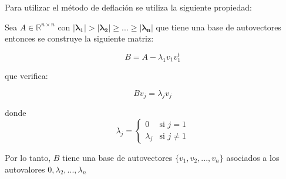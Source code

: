 Para utilizar el método de deflación se utiliza la siguiente propiedad: 

Sea $A \in \mathbb{R}^{n \times n}$ con $|\mathbf{\lambda_1}| > |\mathbf{\lambda_2}| \geq \mathbf{...} \geq |\mathbf{\lambda_n}|$ que tiene una base de autovectores entonces se construye la siguiente matriz:

\begin{equation}
    B = A - \lambda_{1}v_{1}v^{t}_{1}
\end{equation}

que verifica:

\begin{equation}
    Bv_{j}=\lambda_{j}v_{j}
\end{equation}

donde \begin{equation}
    \lambda_{j} = 
        \begin{cases}
            0 & \text {si $j = 1$}\\
            \lambda_{j} & \text {si $j \neq 1$}
        \end{cases}
\end{equation}

Por lo tanto, $B$ tiene una base de autovectores $\{v_{1},v_{2},...,v_{n}\}$ asociados a los autovalores $0, \lambda_{2}, ... , \lambda_{n}$
